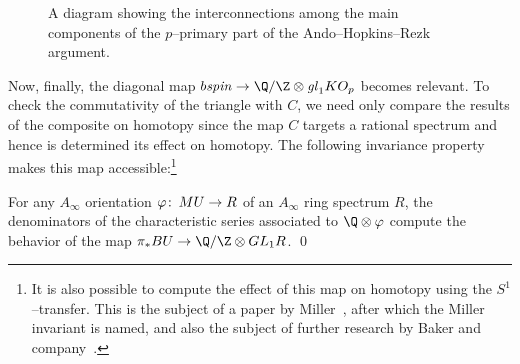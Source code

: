 \begin{sidewaysfigure}
\centering
{}
\caption{A diagram showing the interconnections among the main components of the $p$--primary part of the Ando--Hopkins--Rezk argument.}\label{MainAHRDiagram}
\end{sidewaysfigure}

Now, finally, the diagonal map $b\spin \to \Q/\Z \otimes \gl_1 KO_p$ becomes relevant.  To check the commutativity of the triangle with $C$, we need only compare the results of the composite on homotopy since the map $C$ targets a rational spectrum and hence is determined its effect on homotopy.  The following invariance property makes this map accessible:\footnote{It is also possible to compute the effect of this map on homotopy using the $S^1$--transfer.  This is the subject of a paper by Miller~\cite{MillerBernoulliNos}, after which the Miller invariant is named, and also the subject of further research by Baker and company~\cite{BCGHRW}.}

\begin{theorem}
For any $A_\infty$ orientation $\varphi\colon\thinspace MU \to R$ of an $A_\infty$ ring spectrum $R$, the denominators of the characteristic series associated to $\Q \otimes \phi$ compute the behavior of the map $\pi_* BU \to \Q / \Z \otimes GL_1 R$. \qed
\end{theorem}

